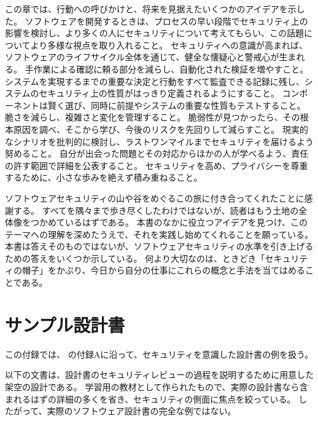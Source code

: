\documentclass[uplatex]{jsarticle}
\begin{document}
この章では、行動への呼びかけと、将来を見据えたいくつかのアイデアを示した。
ソフトウェアを開発するときは、プロセスの早い段階でセキュリティ上の影響を検討し、より多くの人にセキュリティについて考えてもらい、この話題についてより多様な視点を取り入れること。
セキュリティへの意識が高まれば、ソフトウェアのライフサイクル全体を通じて、健全な懐疑心と警戒心が生まれる。
手作業による確認に頼る部分を減らし、自動化された検証を増やすこと。
システムを実現するまでの重要な決定と行動をすべて監査できる記録に残し、システムのセキュリティ上の性質がはっきり定義されるようにすること。
コンポーネントは賢く選び、同時に前提やシステムの重要な性質もテストすること。
脆さを減らし、複雑さと変化を管理すること。
脆弱性が見つかったら、その根本原因を調べ、そこから学び、今後のリスクを先回りして減らすこと。
現実的なシナリオを批判的に検討し、ラストワンマイルまでセキュリティを届けるよう努めること。
自分が出会った問題とその対応からほかの人が学べるよう、責任の許す範囲で詳細を公表すること。
セキュリティを高め、プライバシーを尊重するために、小さな歩みを絶えず積み重ねること。

ソフトウェアセキュリティの山や谷をめぐるこの旅に付き合ってくれたことに感謝する。
すべてを隅々まで歩き尽くしたわけではないが、読者はもう土地の全体像をつかめているはずである。
本書のなかに役立つアイデアを見つけ、このテーマへの理解を深めたうえで、それを実践し始めてくれることを願っている。
本書は答えそのものではないが、ソフトウェアセキュリティの水準を引き上げるための答えをいくつか示している。
何より大切なのは、ときどき「セキュリティの帽子」をかぶり、今日から自分の仕事にこれらの概念と手法を当てはめることである。

\newpage

\appendix

\section{サンプル設計書}

この付録では、\cite{Kohnfelder2021} の付録Aに沿って、セキュリティを意識した設計書の例を扱う。

以下の文書は、設計書のセキュリティレビューの過程を説明するために用意した架空の設計である。
学習用の教材として作られたもので、実際の設計書なら含まれるはずの詳細の多くを省き、セキュリティの側面に焦点を絞っている。
したがって、実際のソフトウェア設計書の完全な例ではない。
\end{document}
